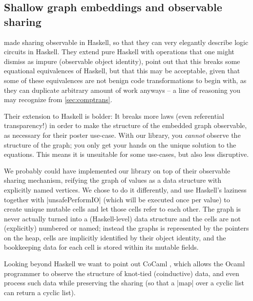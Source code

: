 \documentclass[manuscript,anonymous,screen,acmsmall]{acmart}
\begin{document}
%

\subsection{Shallow graph embeddings and observable sharing}

 made sharing observable in Haskell, so that they can very elegantly describe logic circuits in Haskell. They extend pure Haskell with operations that one might dismiss as impure (observable object identity), point out that this breaks some equational equivalences of Haskell, but that this may be acceptable, given that some of these equivalences  are not benign code transformations to begin with, as they can duplicate arbitrary amount of work anyways -- a line of reasoning you may recognize from \cref{sec:comptrans}.

Their extension to Haskell is bolder: It breaks more laws (even referential transparency!) in order to make the structure of the embedded graph observable, as necessary for their poster use-case. With our library, you \emph{cannot} observe the structure of the graph; you only get your hands on the unique solution to the equations. This means it is unsuitable for some use-cases, but also less disruptive.

We probably could have implemented our library on top of their observable sharing mechanism, reifying the graph of values as a data structure with explicitly named vertices. We chose to do it differently, and use Haskell's laziness together with |unsafePerformIO| (which will be executed once per value) to create unique mutable cells and let those cells refer to each other. The graph is never actually turned into a (Haskell-level) data structure and the cells are not (explicitly) numbered or named; instead the graphs is represented by the pointers on the heap, cells are implicitly identified by their object identity, and the bookkeeping data for each cell is stored within its mutable fields.

Looking beyond Haskell we want to point out CoCaml \citep{cocaml}, which allows the Ocaml programmer to observe the structure of knot-tied (coinductive) data, and even process such data while preserving the sharing (so that a |map| over a cyclic list can return a cyclic list).
\end{document}
